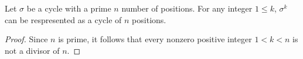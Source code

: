 \documentclass[12pt]{article}
\newenvironment{corollary}[2][Corollary]{\begin{trivlist} \item[\hskip \labelsep {\bfseries #1}\hskip \labelsep {\bfseries #2.}]}{\end{trivlist}}
\begin{document}
\begin{corollary}{a1}
  Let $\sigma$ be a cycle with a prime $n$ number of positions. For any integer $1\leq k$, $\sigma^{k}$ can be respresented as a cycle of $n$ positions.
\begin{proof}
  Since $n$ is prime, it follows that every nonzero positive integer $1<k<n$ is not a divisor of $n$.
\end{proof}
\end{corollary}
       
\end{document}
